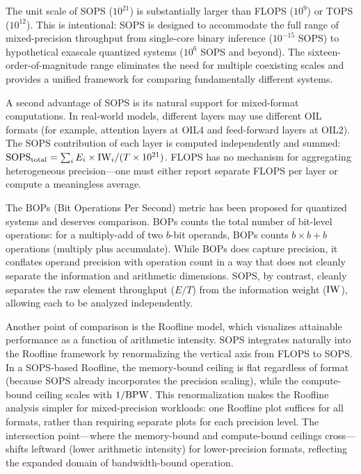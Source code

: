 The unit scale of SOPS ($10^{21}$) is substantially larger than FLOPS ($10^9$) or TOPS ($10^{12}$). This is intentional: SOPS is designed to accommodate the full range of mixed-precision throughput from single-core binary inference ($10^{-15}$ SOPS) to hypothetical exascale quantized systems ($10^6$ SOPS and beyond). The sixteen-order-of-magnitude range eliminates the need for multiple coexisting scales and provides a unified framework for comparing fundamentally different systems.

A second advantage of SOPS is its natural support for mixed-format computations. In real-world models, different layers may use different OIL formats (for example, attention layers at OIL4 and feed-forward layers at OIL2). The SOPS contribution of each layer is computed independently and summed: $\text{SOPS}_{\text{total}} = \sum_i E_i \times \mathrm{IW}_i / (T \times 10^{21})$. FLOPS has no mechanism for aggregating heterogeneous precision---one must either report separate FLOPS per layer or compute a meaningless average.

The BOPs (Bit Operations Per Second) metric has been proposed for quantized systems and deserves comparison. BOPs counts the total number of bit-level operations: for a multiply-add of two $b$-bit operands, BOPs counts $b \times b + b$ operations (multiply plus accumulate). While BOPs does capture precision, it conflates operand precision with operation count in a way that does not cleanly separate the information and arithmetic dimensions. SOPS, by contrast, cleanly separates the raw element throughput ($E/T$) from the information weight ($\mathrm{IW}$), allowing each to be analyzed independently.

Another point of comparison is the Roofline model, which visualizes attainable performance as a function of arithmetic intensity. SOPS integrates naturally into the Roofline framework by renormalizing the vertical axis from FLOPS to SOPS. In a SOPS-based Roofline, the memory-bound ceiling is flat regardless of format (because SOPS already incorporates the precision scaling), while the compute-bound ceiling scales with $1/\textnormal{BPW}$. This renormalization makes the Roofline analysis simpler for mixed-precision workloads: one Roofline plot suffices for all formats, rather than requiring separate plots for each precision level. The intersection point---where the memory-bound and compute-bound ceilings cross---shifts leftward (lower arithmetic intensity) for lower-precision formats, reflecting the expanded domain of bandwidth-bound operation.

